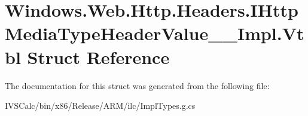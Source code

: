\hypertarget{struct_windows_1_1_web_1_1_http_1_1_headers_1_1_i_http_media_type_header_value_____impl_1_1_vtbl}{}\section{Windows.\+Web.\+Http.\+Headers.\+I\+Http\+Media\+Type\+Header\+Value\+\_\+\+\_\+\+Impl.\+Vtbl Struct Reference}
\label{struct_windows_1_1_web_1_1_http_1_1_headers_1_1_i_http_media_type_header_value_____impl_1_1_vtbl}


The documentation for this struct was generated from the following file\+:\begin{DoxyCompactItemize}
\item 
I\+V\+S\+Calc/bin/x86/\+Release/\+A\+R\+M/ilc/Impl\+Types.\+g.\+cs\end{DoxyCompactItemize}

